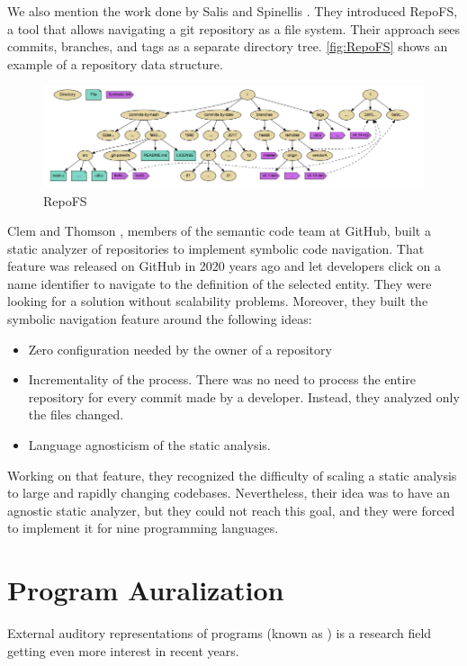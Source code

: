 We also mention the work done by Salis and Spinellis \cite[]{Salis2019}.
They introduced RepoFS, a tool that allows navigating a git repository as a file system. 
Their approach sees commits, branches, and tags as a separate directory tree. 
\autoref{fig:RepoFS} shows an example of a repository data structure. 

\begin{figure}[H]
\centering
  \includegraphics[width=0.9\linewidth]{Salis2019.png} 
  \caption{RepoFS}
  \label{fig:RepoFS}
\end{figure}

Clem and Thomson \cite{Clem2021}, members of the semantic code team at GitHub, built a static analyzer of repositories to implement symbolic code navigation. 
That feature was released on GitHub in 2020 years ago and let developers click on a name identifier to navigate to the definition of the selected entity. 
They were looking for a solution without scalability problems. 
Moreover, they built the symbolic navigation feature around the following ideas:
\begin{itemize}
  \item Zero configuration needed by the owner of a repository
  \item Incrementality of the process. There was no need to process the entire repository for every commit made by a developer. Instead, they analyzed only the files changed. 
  \item Language agnosticism of the static analysis. 
\end{itemize}

Working on that feature, they recognized the difficulty of scaling a static analysis to large and rapidly changing codebases.
Nevertheless, their idea was to have an agnostic static analyzer, but they could not reach this goal, and they were forced to implement it for nine programming languages.  

\section{Program Auralization}

External auditory representations of programs (known as ) is a research field getting even more interest in recent years.

